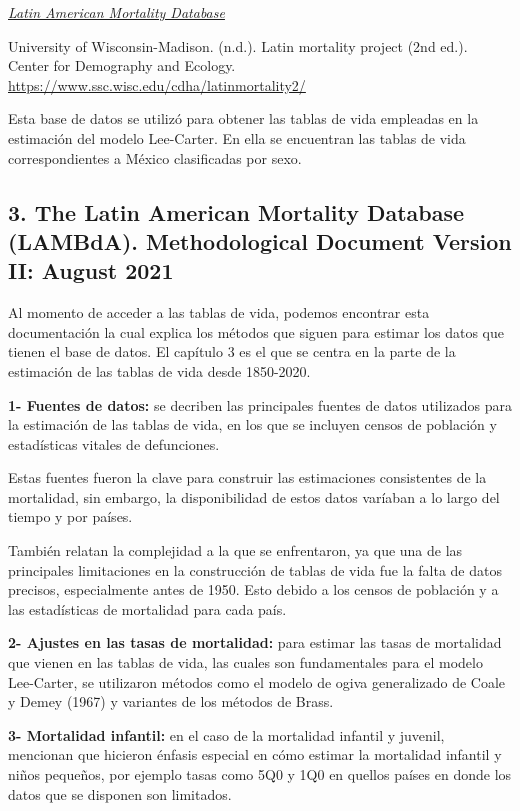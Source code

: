 \documentclass[
]{article}
\begin{document}
\href{https://www.ssc.wisc.edu/cdha/latinmortality2/?page_id=28}{\emph{Latin
American Mortality Database}}

University of Wisconsin-Madison. (n.d.). Latin mortality project (2nd
ed.). Center for Demography and Ecology.
\url{https://www.ssc.wisc.edu/cdha/latinmortality2/}

Esta base de datos se utilizó para obtener las tablas de vida empleadas
en la estimación del modelo Lee-Carter. En ella se encuentran las tablas
de vida correspondientes a México clasificadas por sexo.

\hypertarget{the-latin-american-mortality-database-lambda.-methodological-document-version-ii-august-2021}{%
\subsection{3. The Latin American Mortality Database (LAMBdA).
Methodological Document Version II: August
2021}\label{the-latin-american-mortality-database-lambda.-methodological-document-version-ii-august-2021}}

Al momento de acceder a las tablas de vida, podemos encontrar esta
documentación la cual explica los métodos que siguen para estimar los
datos que tienen el base de datos. El capítulo 3 es el que se centra en
la parte de la estimación de las tablas de vida desde 1850-2020.

\textbf{1- Fuentes de datos:} se decriben las principales fuentes de
datos utilizados para la estimación de las tablas de vida, en los que se
incluyen censos de población y estadísticas vitales de defunciones.

Estas fuentes fueron la clave para construir las estimaciones
consistentes de la mortalidad, sin embargo, la disponibilidad de estos
datos varíaban a lo largo del tiempo y por países.

También relatan la complejidad a la que se enfrentaron, ya que una de
las principales limitaciones en la construcción de tablas de vida fue la
falta de datos precisos, especialmente antes de 1950. Esto debido a los
censos de población y a las estadísticas de mortalidad para cada país.

\textbf{2- Ajustes en las tasas de mortalidad:} para estimar las tasas
de mortalidad que vienen en las tablas de vida, las cuales son
fundamentales para el modelo Lee-Carter, se utilizaron métodos como el
modelo de ogiva generalizado de Coale y Demey (1967) y variantes de los
métodos de Brass.

\textbf{3- Mortalidad infantil:} en el caso de la mortalidad infantil y
juvenil, mencionan que hicieron énfasis especial en cómo estimar la
mortalidad infantil y niños pequeños, por ejemplo tasas como 5Q0 y 1Q0
en quellos países en donde los datos que se disponen son limitados.
\end{document}
